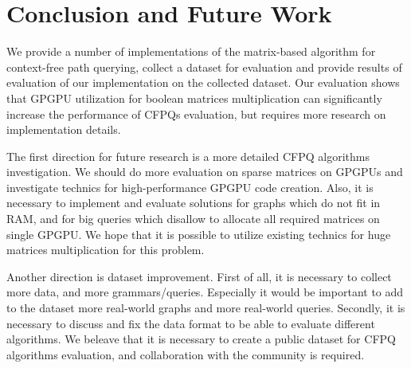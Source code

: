 \section{Conclusion and Future Work}

We provide a number of implementations of the matrix-based algorithm for context-free path querying, collect a dataset for evaluation and provide results of evaluation of our implementation on the collected dataset.
Our evaluation shows that GPGPU utilization for boolean matrices multiplication can significantly increase the performance of CFPQs evaluation, but requires more research on implementation details.

The first direction for future research is a more detailed CFPQ algorithms investigation.
We should do more evaluation on sparse matrices on GPGPUs and investigate technics for high-performance GPGPU code creation.
Also, it is necessary to implement and evaluate solutions for graphs which do not fit in RAM, and for big queries which disallow to allocate all required matrices on single GPGPU.
We hope that it is possible to utilize existing technics for huge matrices multiplication for this problem.

Another direction is dataset improvement.
First of all, it is necessary to collect more data, and more grammars/queries.
Especially it would be important to add to the dataset more real-world graphs and more real-world queries.
Secondly, it is necessary to discuss and fix the data format to be able to evaluate different algorithms.
We beleave that it is necessary to create a public dataset for CFPQ algorithms evaluation, and collaboration with the community is required.

